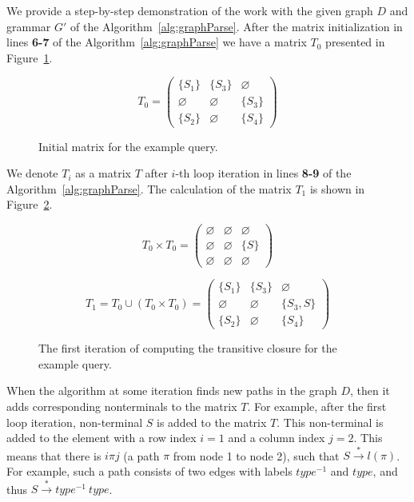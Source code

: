 \documentclass[runningheads,a4paper]{llncs}
\begin{document}
We provide a step-by-step demonstration of the work with the given graph $D$ and grammar $G'$ of the Algorithm~\ref{alg:graphParse}. After the matrix initialization in lines \textbf{6-7} of the Algorithm~\ref{alg:graphParse} we have a matrix $T_0$ presented in Figure~\ref{ExampleQueryInitMatrix}.

\begin{figure}[h]
	\[
	T_0 = \begin{pmatrix}
	\{S_1\} & \{S_3\} & \varnothing \\ \varnothing & \varnothing & \{S_3\} \\ \{S_2\} & \varnothing & \{S_4\}
	\end{pmatrix}
	\]
	\caption{Initial matrix for the example query.}
	\label{ExampleQueryInitMatrix}
\end{figure}

We denote $T_i$ as a matrix $T$ after $i$-th loop iteration in lines \textbf{8-9} of the Algorithm~\ref{alg:graphParse}. The calculation of the matrix $T_1$ is shown in Figure~\ref{ExampleQueryFirstIteration}.

\begin{figure}[h]
	\[
	T_0 \times T_0 = \begin{pmatrix}
	\varnothing & \varnothing & \varnothing \\ \varnothing & \varnothing & \{S\} \\ \varnothing & \varnothing & \varnothing
	\end{pmatrix}
	\]
	
	\[
	T_1 = T_0 \cup (T_0 \times T_0) = \begin{pmatrix}
	\{S_1\} & \{S_3\} & \varnothing \\ \varnothing & \varnothing & \{S_3, S\} \\ \{S_2\} & \varnothing & \{S_4\}
	\end{pmatrix}
	\]
	\caption{The first iteration of computing the transitive closure for the example query.}
	\label{ExampleQueryFirstIteration}
\end{figure}

When the algorithm at some iteration finds new paths in the graph $D$, then it adds corresponding nonterminals to the matrix $T$. For example, after the first loop iteration, non-terminal $S$ is added to the matrix $T$. This non-terminal is added to the element with a row index $i = 1$ and a column index $j = 2$. This means that there is $i\pi j$ (a path $\pi$ from node 1 to node 2), such that $S \xrightarrow{*} l(\pi)$. For example, such a path consists of two edges with labels $type^{-1}$ and $type$, and thus $S \xrightarrow{*} type^{-1} \ type$.
\end{document}
